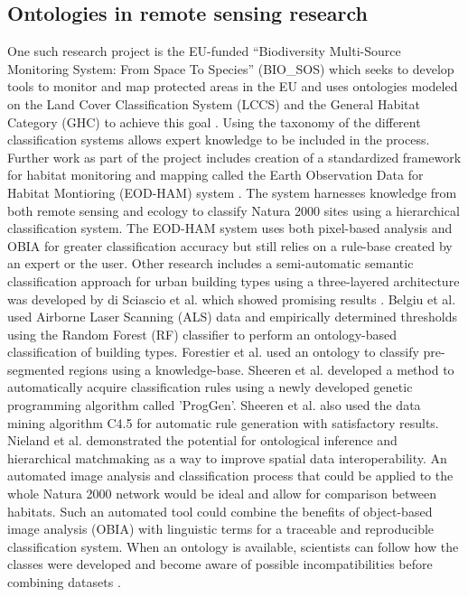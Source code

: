 \documentclass[authoryear, review,12pt,number]{elsarticle}
\begin{document}
\subsection{Ontologies in remote sensing research}
One such research project is the EU-funded ``Biodiversity Multi-Source
Monitoring System:
From Space To Species'' (BIO\_SOS) which seeks to develop tools to monitor and
map protected areas in the EU and uses ontologies modeled on the Land Cover
Classification System (LCCS) and the General Habitat Category (GHC) to achieve
this goal \citep{Arvor2013}. Using the taxonomy of the different classification
systems allows expert knowledge to be included in the process.
Further work as part of the project includes creation of a standardized
framework for habitat monitoring and mapping called the Earth Observation Data
for Habitat Montioring (EOD-HAM) system \citep{Lucas2015}. The system harnesses
knowledge from both remote sensing and ecology to classify Natura 2000 sites
using a hierarchical classification system. The EOD-HAM system uses both
pixel-based analysis and OBIA for greater classification accuracy but still
relies on a rule-base created by an expert or the user. Other research includes
a semi-automatic semantic classification approach for urban building types using
a three-layered architecture was developed by di Sciascio et al. which showed
promising results \citep{diSciascio2013}. Belgiu et al. \citep{Belgiu2014} used
Airborne Laser Scanning (ALS) data and empirically determined thresholds using
the Random Forest (RF) classifier to perform an ontology-based classification of
building types. Forestier et al. \citep{Forestier2012470} used an ontology to
classify pre-segmented regions using a knowledge-base. Sheeren et al.
\citep{Sheeren2006ML} developed a method to automatically acquire classification
rules using a newly developed genetic programming algorithm called 'ProgGen'.
Sheeren et al. also used the data mining algorithm C4.5 for automatic rule
generation with satisfactory results. Nieland et al. \citep{Nieland2015}
demonstrated the potential for ontological inference and hierarchical
matchmaking as a way to improve spatial data interoperability. An automated
image analysis and classification process that could be applied to the whole
Natura 2000 network would be ideal and allow for comparison between habitats.
Such an automated tool could combine the benefits of object-based image analysis
(OBIA) with linguistic terms for a traceable and reproducible classification
system. When an ontology is available, scientists can follow how the classes
were developed and become aware of possible incompatibilities before combining
datasets \citep{Janowicz2012}.
\end{document}
